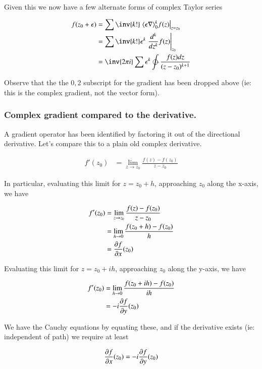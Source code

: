 Given this we now have a few alternate forms of complex Taylor series

\begin{align*}
f(z_0 + \epsilon) 
&= \sum \inv{k!} \left. \gpgradezero{\epsilon \grad}^k f(z) \right\vert_{z=z_0} \\
&= \sum \inv{k!} \epsilon^k \left. \frac{d^k}{dz^k} f(z) \right\vert_{z_0} \\
&= \inv{2 \pi i} \sum \epsilon^k \ointctrclockwise \frac{f(z) dz}{(z - z_0)^{k+1}} 
\end{align*}

Observe that the the $0,2$ subscript for the gradient has been dropped above (ie: this is the complex gradient, not the vector 
form).

\subsubsection{Complex gradient compared to the derivative. }

A gradient operator has been identified by factoring it out of the directional derivative.  Let's compare this to a
plain old complex derivative.

\begin{align*}
f'(z_0) &= \lim_{z \rightarrow z_0} \frac{ f(z) - f(z_0) }{ z - z_0}
\end{align*}

In particular, evaluating this limit for $z = z_0 + h$, approaching $z_0$ along the x-axis, we have

\begin{align*}
f'(z_0) 
&= \lim_{z \rightarrow z_0} \frac{ f(z) - f(z_0) }{ z - z_0} \\
&= \lim_{h \rightarrow 0} \frac{ f(z_0 + h) - f(z_0) }{ h } \\
&= \PD{x}{f}(z_0)
\end{align*}

Evaluating this limit for $z = z_0 + i h$, approaching $z_0$ along the y-axis, we have

\begin{align*}
f'(z_0) 
&= \lim_{h \rightarrow 0} \frac{ f(z_0 + i h) - f(z_0) }{ i h } \\
&= -i \PD{y}{f}(z_0)
\end{align*}

We have the Cauchy equations by equating these, and if the derivative exists (ie: independent of path) we require at least

\begin{align*}
\PD{x}{f}(z_0) =
-i \PD{y}{f}(z_0)
\end{align*}

